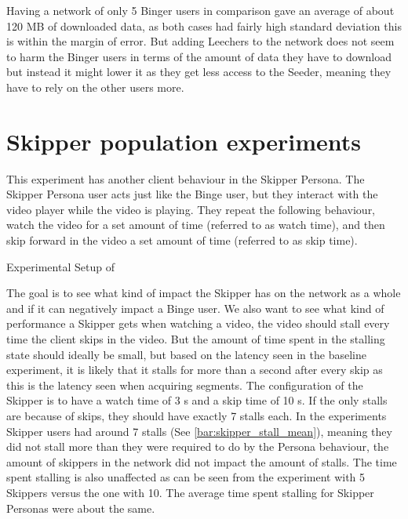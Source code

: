 \if{}

\fi

Having a network of only 5 Binger users in comparison gave an average of about 120 \ac{MB} of downloaded data, as both cases had fairly high standard deviation this is within the margin of error. But adding Leechers to the network does not seem to harm the Binger users in terms of the amount of data they have to download but instead it might lower it as they get less access to the Seeder, meaning they have to rely on the other users more.

\FloatBarrier \section{Skipper population experiments}
\label{sec:eval_skipper}
This experiment has another client behaviour in the Skipper Persona.
The Skipper Persona user acts just like the Binge user, but they interact with the video player while the video is playing. They repeat the following behaviour, watch the video for a set amount of time (referred to as watch time), and then skip forward in the video a set amount of time (referred to as skip time).

\begin{table}[!htbp]
\myfloatalign
\caption[Experimental Setup of Skipper]{Experimental Setup of }
\label{tab:exp_overview_skipper}

\end{table}


The goal is to see what kind of impact the Skipper has on the network as a whole and if it can negatively impact a Binge user. We also want to see what kind of performance a Skipper gets when watching a video, the video should stall every time the client skips in the video. But the amount of time spent in the stalling state should ideally be small, but based on the latency seen in the baseline experiment, it is likely that it stalls for more than a second after every skip as this is the latency seen when acquiring segments. The configuration of the Skipper is to have a watch time of 3 \ac{s} and a skip time of 10 \ac{s}. If the only stalls are because of skips, they should have exactly 7 stalls each.
In the experiments Skipper users had around 7 stalls (See \autoref{bar:skipper_stall_mean}), meaning they did not stall more than they were required to do by the Persona behaviour, the amount of skippers in the network did not impact the amount of stalls. The time spent stalling is also unaffected as can be seen from the experiment with 5 Skippers versus the one with 10. The average time spent stalling for Skipper Personas were about the same.

